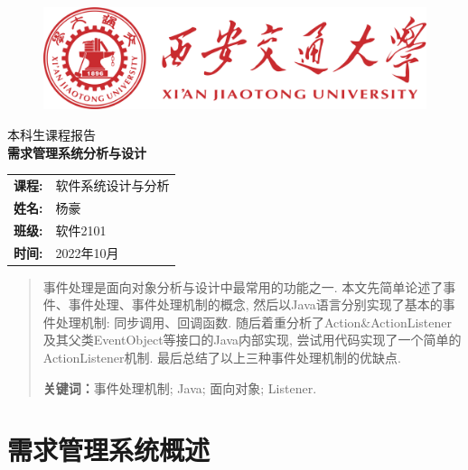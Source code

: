 \documentclass[12pt, a4paper, oneside]{ctexart}
\begin{document}
\thispagestyle{empty}

\begin{figure}[t]
    \centering
    \includegraphics[width=13cm]{../pic/xjtu.png}
\end{figure}

\vspace*{\fill}
    \begin{center}
        \centering
        \vspace{-3cm}
        \fangsong\huge{本科生课程报告} \\\kaishu \Huge{\textbf{需求管理系统分析与设计}}
    \end{center}
\vspace*{\fill}

\begin{table}[b]
    \centering
    \large
    \begin{tabular}{ll}
        \textbf{课程:} & 软件系统设计与分析 \\
        \textbf{姓名:} & 杨豪 \\
        \textbf{班级:} & 软件2101 \\
        \textbf{时间:} & 2022年10月 \\
    \end{tabular}
\end{table}

\newpage

\thispagestyle{empty}
\begin{abstract}
    事件处理是面向对象分析与设计中最常用的功能之一. 本文先简单论述了事件、事件处理、事件处理机制的概念, 然后以Java语言分别实现了基本的事件处理机制: 
    同步调用、回调函数. 随后着重分析了Action\&ActionListener及其父类EventObject等接口的Java内部实现, 尝试用代码实现了一个简单的ActionListener机制. 
    最后总结了以上三种事件处理机制的优缺点. 
    \par\textbf{关键词：}事件处理机制; Java; 面向对象; Listener. 
\end{abstract}

\newpage
{}
\setcounter{page}{1}
\tableofcontents
\newpage
\setcounter{page}{1}

\section{需求管理系统概述}
\end{document}
